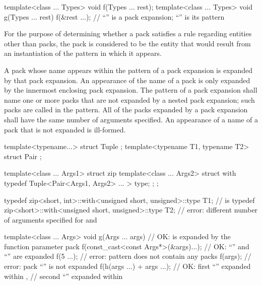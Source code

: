 \begin{example}
\begin{codeblock}
template<class ... Types> void f(Types ... rest);
template<class ... Types> void g(Types ... rest) {
  f(&rest ...);     // ``'' is a pack expansion; ``'' is its pattern
}
\end{codeblock}
\end{example}

\pnum
For the purpose of determining whether a pack satisfies a rule
regarding entities other than packs, the pack is
considered to be the entity that would result from an instantiation of
the pattern in which it appears.

\pnum
A pack whose name appears within the pattern of a pack
expansion is expanded by that pack expansion. An appearance of the name of
a pack is only expanded by the innermost enclosing pack expansion.
The pattern of a pack expansion shall name one or more packs that
are not expanded by a nested pack expansion; such packs are called
 in the pattern. All of the packs expanded
by a pack expansion shall have the same number of arguments specified. An
appearance of a name of a pack that is not expanded is
ill-formed. \begin{example}

\begin{codeblock}
template<typename...> struct Tuple {};
template<typename T1, typename T2> struct Pair {};

template<class ... Args1> struct zip {
  template<class ... Args2> struct with {
    typedef Tuple<Pair<Args1, Args2> ... > type;
  };
};

typedef zip<short, int>::with<unsigned short, unsigned>::type T1;
    //  is 
typedef zip<short>::with<unsigned short, unsigned>::type T2;
    // error: different number of arguments specified for  and 

template<class ... Args>
  void g(Args ... args) {                   // OK:  is expanded by the function parameter pack 
    f(const_cast<const Args*>(&args)...);   // OK: ``'' and ``'' are expanded
    f(5 ...);                               // error: pattern does not contain any packs
    f(args);                                // error: pack ``'' is not expanded
    f(h(args ...) + args ...);              // OK: first ``'' expanded within ,
                                            // second ``'' expanded within 
  }
\end{codeblock}

\end{example}

